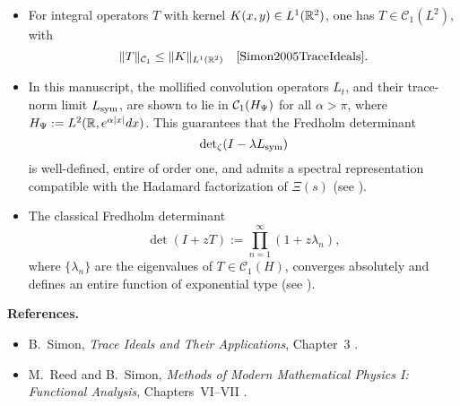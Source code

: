\begin{definition}
\begin{itemize}
    \item For integral operators \( T \) with kernel \( K(x, y) \in L^1(\mathbb{R}^2) \), one has \( T \in \mathcal{C}_1(L^2) \), with
    \[
    \| T \|_{\mathcal{C}_1} \le \| K \|_{L^1(\R^2)} \quad \text{\cite[Thm.~4.2]{Simon2005TraceIdeals}}.
    \]

    \item In this manuscript, the mollified convolution operators \( L_t \), and their trace-norm limit \( L_{\mathrm{sym}} \), are shown to lie in \( \mathcal{C}_1(H_{\Psi}) \) for all \( \alpha > \pi \), where \( H_{\Psi} := L^2(\mathbb{R}, e^{\alpha |x|} dx) \). This guarantees that the Fredholm determinant
    \[
    \det\nolimits_{\zeta}(I - \lambda L_{\mathrm{sym}})
    \]
    is well-defined, entire of order one, and admits a spectral representation compatible with the Hadamard factorization of \( \Xi(s) \) (see ).

    \item The classical Fredholm determinant
    \[
    \det(I + zT) := \prod_{n=1}^\infty (1 + z \lambda_n),
    \]
    where \( \{ \lambda_n \} \) are the eigenvalues of \( T \in \mathcal{C}_1(H) \), converges absolutely and defines an entire function of exponential type (see ).
\end{itemize}

\medskip
\noindent\textbf{References.}
\begin{itemize}
    \item B.~Simon, \emph{Trace Ideals and Their Applications}, Chapter~3 \cite{Simon2005TraceIdeals}.
    \item M.~Reed and B.~Simon, \emph{Methods of Modern Mathematical Physics I: Functional Analysis}, Chapters~VI--VII \cite{ReedSimon1980I}.
\end{itemize}
\end{definition}
